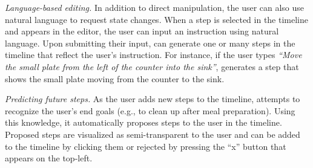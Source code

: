 \emph{Language-based editing.} In addition to direct manipulation, the user can also use natural language to request state changes. When a step is selected in the timeline and appears in the editor, the user can input an instruction using natural language. Upon submitting their input, \projname can generate one or many steps in the timeline that reflect the user's instruction. For instance, if the user types \textit{``Move the small plate from the left of the counter into the sink''}, \projname generates a step that shows the small plate moving from the counter to the sink. 

\emph{Predicting future steps.} As the user adds new steps to the timeline, \projname attempts to recognize the user's end goals (e.g., to clean up after meal preparation). Using this knowledge, it automatically proposes steps to the user in the timeline. Proposed steps are visualized as semi-transparent to the user and can be added to the timeline by clicking them or rejected by pressing the ``x'' button that appears on the top-left. 











